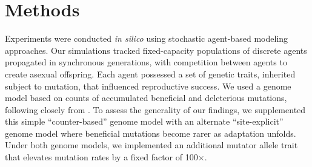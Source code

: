 \section{Methods} \label{sec:methods}

Experiments were conducted \textit{in silico} using stochastic agent-based modeling approaches.
Our simulations tracked fixed-capacity populations of discrete agents propagated in synchronous generations, with competition between agents to create asexual offspring.
Each agent possessed a set of genetic traits, inherited subject to mutation, that influenced reproductive success.
We used a genome model based on counts of accumulated beneficial and deleterious mutations, following closely from \citep{raynes2018sign}.
To assess the generality of our findings, we supplemented this simple ``counter-based'' genome model with an alternate ``site-explicit'' genome model where beneficial mutations become rarer as adaptation unfolds.
Under both genome models, we implemented an additional mutator allele trait that elevates mutation rates by a fixed factor of 100$\times$.
%
%
%
